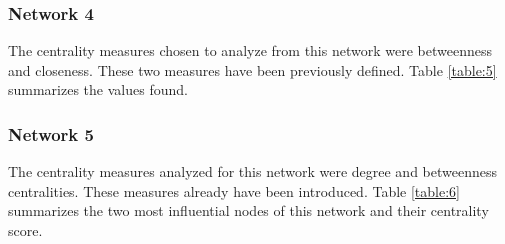 \subsubsection{Network 4}
The centrality measures chosen to analyze from this network were betweenness and closeness. These two measures have been previously defined. Table \ref{table:5} summarizes the values found.
\begin{table}
    \centering
    \qquad
    \caption{Network 4 centrality}
    \label{table:5}
\end{table}

\subsubsection{Network 5}
The centrality measures analyzed for this network were degree and betweenness centralities. These measures already have been introduced. Table \ref{table:6} summarizes the two most influential nodes of this network and their centrality score.
\begin{table}
    \centering
    \qquad
    \caption{Network 5 centrality}
    \label{table:6}
\end{table}

